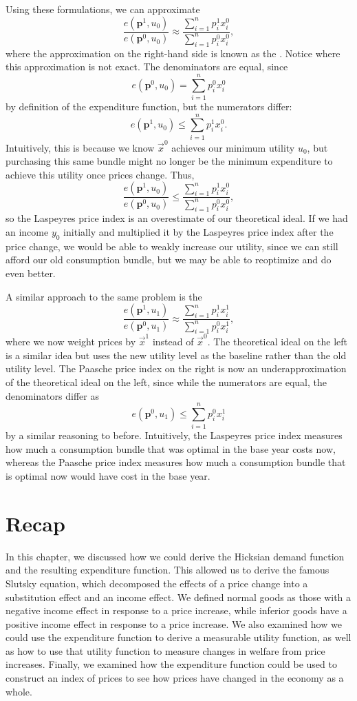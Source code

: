 Using these formulations, we can approximate 
$$\frac{e\left(\mathbf{p}^{1}, u_{0}\right)}{e\left(\mathbf{p}^{0}, u_{0}\right)} \approx \frac{\sum_{i=1}^{n} p_{i}^{1} x_{i}^{0}}{\sum_{i=1}^{n} p_{i}^{0} x_{i}^{0}},$$
where the approximation on the right-hand side is known as the . Notice where this approximation is not exact. The denominators are equal, since 
$$e\left(\mathbf{p}^{0}, u_{0}\right) = \sum_{i=1}^{n} p_{i}^{0} x_{i}^{0}$$
by definition of the expenditure function, but the numerators differ:
$$e\left(\mathbf{p}^{1}, u_{0}\right) \leq \sum_{i=1}^{n} p_{i}^{1} x_{i}^{0}.$$
Intuitively, this is because we know $\vec{x}^0$ achieves our minimum utility $u_0$, but purchasing this same bundle might no longer be the minimum expenditure to achieve this utility once prices change. Thus, 
$$\frac{e\left(\mathbf{p}^{1}, u_{0}\right)}{e\left(\mathbf{p}^{0}, u_{0}\right)} \leq \frac{\sum_{i=1}^{n} p_{i}^{1} x_{i}^{0}}{\sum_{i=1}^{n} p_{i}^{0} x_{i}^{0}},$$
so the Laspeyres price index is an overestimate of our theoretical ideal. If we had an income $y_0$ initially and multiplied it by the Laspeyres price index after the price change, we would be able to weakly increase our utility, since we can still afford our old consumption bundle, but we may be able to reoptimize and do even better.

A similar approach to the same problem is the 
$$\frac{e\left(\mathbf{p}^{1}, u_{1}\right)}{e\left(\mathbf{p}^{0}, u_{1}\right)} \approx \frac{\sum_{i=1}^{n} p_{i}^{1} x_{i}^{1}}{\sum_{i=1}^{n} p_{i}^{0} x_{i}^{1}},$$
where we now weight prices by $\vec{x}^1$ instead of $\vec{x}^0$. The theoretical ideal on the left is a similar idea but uses the new utility level as the baseline rather than the old utility level. The Paasche price index on the right is now an underapproximation of the theoretical ideal on the left, since while the numerators are equal, the denominators differ as
$$e\left(\mathbf{p}^{0}, u_{1}\right) \leq \sum_{i=1}^{n} p_{i}^{0} x_{i}^{1}$$
by a similar reasoning to before. Intuitively, the Laspeyres price index measures how much a consumption bundle that was optimal in the base year costs now, whereas the Paasche price index measures how much a consumption bundle that is optimal now would have cost in the base year. 

\section*{Recap}
In this chapter, we discussed how we could derive the Hicksian demand function and the resulting expenditure function. This allowed us to derive the famous Slutsky equation, which decomposed the effects of a price change into a substitution effect and an income effect. We defined normal goods as those with a negative income effect in response to a price increase, while inferior goods have a positive income effect in response to a price increase. We also examined how we could use the expenditure function to derive a measurable utility function, as well as how to use that utility function to measure changes in welfare from price increases. Finally, we examined how the expenditure function could be used to construct an index of prices to see how prices have changed in the economy as a whole. 